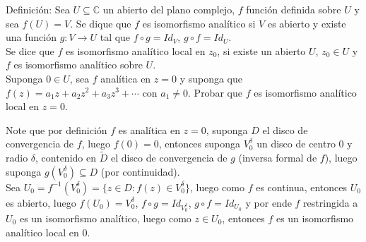 \begin{homeworkProblem}
  Definición: Sea $U\subseteq \mathbb{C}$ un abierto del plano complejo, $f$ función definida sobre $U$ y sea $f(U)=V$. Se dique que $f$ es isomorfismo analítico si $V$ es abierto y existe una función $g:V\to U$ tal que $f\circ g=Id_V$, $g\circ f=Id_U$.\\
  Se dice que $f$ es isomorfismo analítico local en $z_0$, si existe un abierto $U$, $z_0\in U$ y $f$ es isomorfismo analítico sobre $U$.\\
  Suponga $0\in U$, sea $f$ analítica en $z = 0$ y suponga que $f(z) = a_1z +a_2z^2+a_3z^3+\cdots$ con $a_1\neq 0$. Probar que $f$ es isomorfismo analítico local en $z=0$.
  \begin{solution}
    Note que por definición $f$ es analítica en $z=0$, suponga $D$ el disco de convergencia de $f$, luego $f(0)=0$, entonces suponga $V_{0}^{\delta}$ un disco de centro $0$ y radio $\delta$, contenido en $\tilde{D}$ el disco de convergencia de $g$ (inversa formal de $f$), luego suponga $g(V_0^{\delta})\subseteq D$ (por continuidad).\\
    Sea $U_0=f^{-1}(V_0^{\delta})=\{z\in D: f(z)\in V_{0}^{\delta}\}$, luego como $f$ es continua, entonces $U_0$ es abierto, luego $f(U_0)=V_0^{\delta}$, $f\circ g=Id_{V_0^{\delta}}$, $g\circ f=Id_{U_0}$ y por ende $f$ restringida a $U_0$ es un isomorfismo analítico, luego como $z\in U_0$, entonces $f$ es un isomorfismo analítico local en $0$. 
    \demostrado
  \end{solution}
\end{homeworkProblem}
